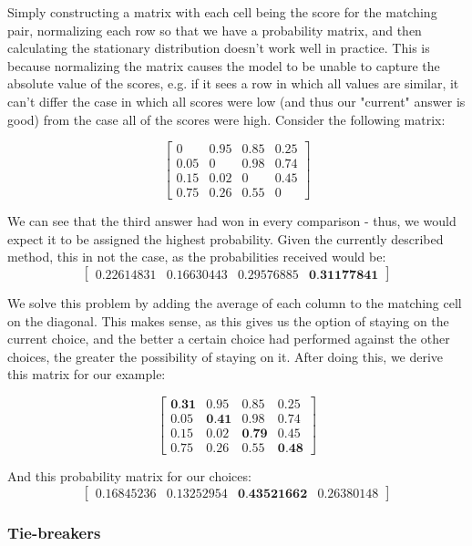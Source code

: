 \documentclass{article}
\begin{document}

Simply constructing a matrix with each cell being the score for the matching pair, normalizing each row so that we have a probability matrix, and then calculating the stationary distribution doesn't work well in practice. This is because normalizing the matrix causes the model to be unable to capture the absolute value of the scores, e.g. if it sees a row in which all values are similar, it can't differ the case in which all scores were low (and thus our "current" answer is good) from the case all of the scores were high.
Consider the following matrix:

$$
\begin{bmatrix}
0 & 0.95 & 0.85 & 0.25 \\
0.05 & 0 & 0.98 & 0.74 \\
0.15 & 0.02 & 0 & 0.45 \\
0.75 & 0.26 & 0.55 & 0
\end{bmatrix}
$$

We can see that the third answer had won in every comparison - thus, we would expect it to be assigned the highest probability. Given the currently described method, this in not the case, as the probabilities received would be:
$$ \begin{bmatrix} 0.22614831 & 0.16630443 & 0.29576885 & \textbf{0.31177841} \end{bmatrix} $$

We solve this problem by adding the average of each column to the matching cell on the diagonal. This makes sense, as this gives us the option of staying on the current choice, and the better a certain choice had performed against the other choices, the greater the possibility of staying on it.
After doing this, we derive this matrix for our example:

$$
\begin{bmatrix}
\textbf{0.31} & 0.95 & 0.85 & 0.25 \\
0.05 & \textbf{0.41} & 0.98 & 0.74 \\
0.15 & 0.02 & \textbf{0.79} & 0.45 \\
0.75 & 0.26 & 0.55 & \textbf{0.48}
\end{bmatrix}
$$

And this probability matrix for our choices:
$$ \begin{bmatrix} 0.16845236 & 0.13252954 & \textbf{0.43521662} & 0.26380148 \end{bmatrix} $$

\subsubsection{Tie-breakers}
\end{document}
